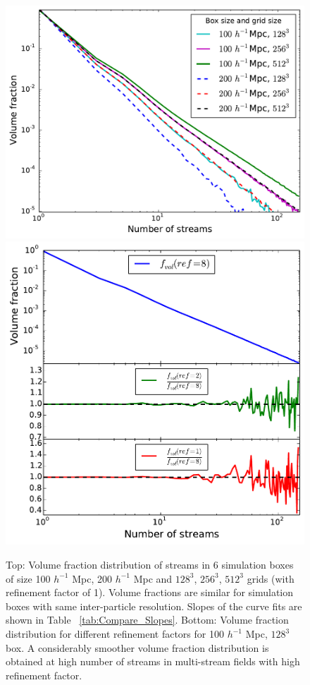 \begin{figure}
\begin{minipage}[t]{.99\linewidth}
 \centering\includegraphics[width=10.cm]{Chapter3/Source_v2/fig3a} 
  \centering\includegraphics[width=10.cm]{Chapter3/Source_v2/fig3b}
\end{minipage}\hfill
\caption{Top: Volume fraction distribution of streams in 6 simulation boxes of size 100 $h^{-1}$ Mpc, 200 $h^{-1}$ Mpc 
and $128^{3}$, $256^{3}$, $512^{3}$ grids (with refinement factor of 1). Volume fractions are similar for simulation boxes with same inter-particle resolution. Slopes of the curve fits are shown in Table ~\ref{tab:Compare_Slopes}. Bottom: Volume fraction distribution for different refinement factors for 100 $h^{-1}$ Mpc, $128^{3}$ box. A considerably smoother volume fraction distribution is obtained at high number of streams in multi-stream fields with high refinement factor. }
\label{fig:1Vfr_all}
\end{figure}

